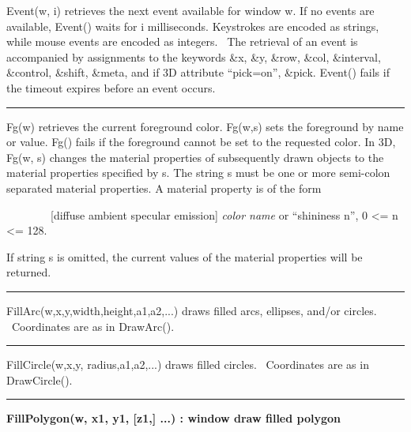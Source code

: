 \noindent
\textsf{Event(w, i)} retrieves the next event available for window
\textsf{w}. If no events are available, \textsf{Event()} waits for
\textsf{i} milliseconds. Keystrokes are encoded as strings, while mouse
events are encoded as integers. \ The retrieval of an event is
accompanied by assignments to the keywords \textsf{\&x}, \textsf{\&y},
\textsf{\&row}, \textsf{\&col}, \textsf{\&interval},
\textsf{\&control}, \textsf{\&shift}, \textsf{\&meta}, and if 3D
attribute \textsf{{\textquotedblleft}pick=on{\textquotedblright}},
\textsf{\&pick}. \textsf{Event()} fails if the timeout expires before
an event occurs.

\bigskip\hrule\vspace{0.1cm}

\noindent
\textsf{Fg(w)} retrieves the current foreground color. \textsf{Fg(w,s)}
sets the foreground by name or value. \textsf{Fg()} fails if the
foreground cannot be set to the requested color. In 3D, \textsf{Fg(w,
s)} changes the material properties of subsequently drawn objects to
the material properties specified by \textsf{s}. The string \textsf{s}
must be one or more semi-colon separated material properties. A
material property is of the form 

\ \ \ \ \ \ \ \ [diffuse {\textbar} ambient {\textbar} specular
{\textbar} emission] \textit{color name} or
{\textquotedblleft}shininess n{\textquotedblright}, 0 {\textless}= n
{\textless}= 128.

If string \textsf{s} is omitted, the current values of the material
properties will be returned.

\bigskip\hrule\vspace{0.1cm}

\noindent
\textsf{FillArc(w,x,y,width,height,a1,a2,...)} draws filled arcs,
ellipses, and/or circles. \ Coordinates are as in \textsf{DrawArc()}.

\bigskip\hrule\vspace{0.1cm}

\noindent
\textsf{FillCircle(w,x,y, radius,a1,a2,...)} draws filled circles.
\ Coordinates are as in \textsf{DrawCircle()}.

\bigskip\hrule\vspace{0.1cm}
\noindent
{\bf FillPolygon(w, x1, y1, [z1,] ...) : window \hfill draw filled polygon}

